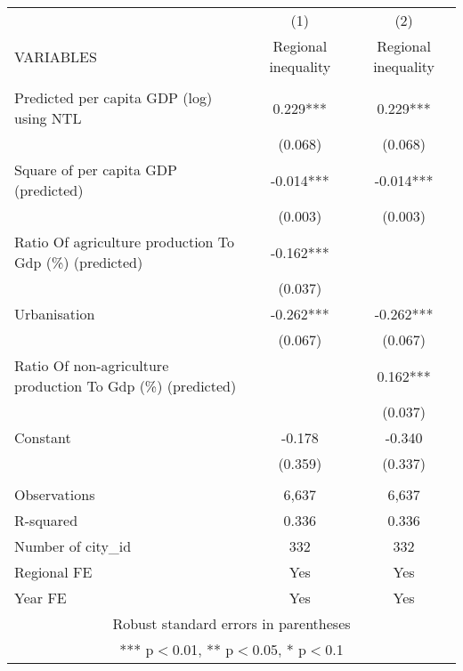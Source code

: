 \documentclass[]{article}
\begin{document}
\begin{tabular}{lcc} \hline
 & (1) & (2) \\
VARIABLES & Regional inequality & Regional inequality \\ \hline
 &  &  \\
Predicted per capita GDP (log) using NTL & 0.229*** & 0.229*** \\
 & (0.068) & (0.068) \\
Square of per capita GDP (predicted) & -0.014*** & -0.014*** \\
 & (0.003) & (0.003) \\
Ratio Of agriculture production To Gdp (\%) (predicted) & -0.162*** &  \\
 & (0.037) &  \\
Urbanisation & -0.262*** & -0.262*** \\
 & (0.067) & (0.067) \\
Ratio Of non-agriculture production To Gdp (\%) (predicted) &  & 0.162*** \\
 &  & (0.037) \\
Constant & -0.178 & -0.340 \\
 & (0.359) & (0.337) \\
 &  &  \\
Observations & 6,637 & 6,637 \\
R-squared & 0.336 & 0.336 \\
Number of city\_id & 332 & 332 \\
Regional FE & Yes & Yes \\
 Year FE & Yes & Yes \\ \hline
\multicolumn{3}{c}{ Robust standard errors in parentheses} \\
\multicolumn{3}{c}{ *** p$<$0.01, ** p$<$0.05, * p$<$0.1} \\
\end{tabular}
\end{document}
